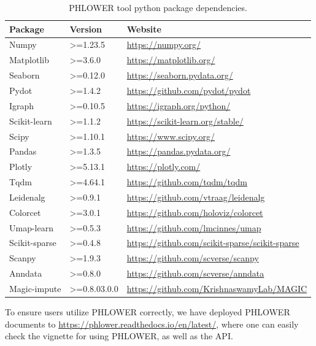\begin{table}[!ht]
	\centering
	\begin{tabular}{lll}
		\toprule
		\textbf{Package} & \textbf{Version} & \textbf{Website} \\
		\midrule
			Numpy& >=1.23.5 & \url{https://numpy.org/} \\
			Matplotlib& >=3.6.0 & \url{https://matplotlib.org/} \\
			Seaborn& >=0.12.0 & \url{https://seaborn.pydata.org/} \\
			Pydot& >=1.4.2 & \url{https://github.com/pydot/pydot} \\
			Igraph& >=0.10.5 & \url{https://igraph.org/python/} \\
			Scikit-learn& >=1.1.2 & \url{https://scikit-learn.org/stable/} \\
			Scipy& >=1.10.1 & \url{https://www.scipy.org/} \\
			Pandas& >=1.3.5 & \url{https://pandas.pydata.org/} \\
			Plotly& >=5.13.1 & \url{https://plotly.com/} \\
			Tqdm& >=4.64.1 & \url{https://github.com/tqdm/tqdm} \\
			Leidenalg& >=0.9.1 & \url{https://github.com/vtraag/leidenalg} \\
			Colorcet& >=3.0.1 & \url{https://github.com/holoviz/colorcet} \\
			Umap-learn& >=0.5.3 & \url{https://github.com/lmcinnes/umap} \\
			Scikit-sparse& >=0.4.8 & \url{https://github.com/scikit-sparse/scikit-sparse} \\
			Scanpy& >=1.9.3 & \url{https://github.com/scverse/scanpy} \\
			Anndata& >=0.8.0 & \url{https://github.com/scverse/anndata} \\
            Magic-impute & >=0.8.03.0.0 & \url{https://github.com/KrishnaswamyLab/MAGIC}\\
		\bottomrule
	\end{tabular}
	\vspace{0.1cm}
	\caption[PHLOWER tool python package dependencies]{PHLOWER tool python package dependencies.}
	\label{tab:phlower_python_dependencies}
\end{table}

To ensure users utilize PHLOWER correctly, we have deployed PHLOWER documents to \url{https://phlower.readthedocs.io/en/latest/}, where one can easily check the vignette for using PHLOWER, as well as the API.

